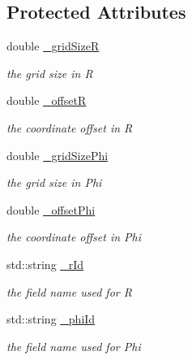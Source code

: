 \subsection*{Protected Attributes}
\begin{DoxyCompactItemize}
\item 
double \hyperlink{class_d_d4hep_1_1_d_d_segmentation_1_1_polar_grid_r_phi_a3f8b1d0889b592d5f6b08a27ef376c18}{\+\_\+grid\+SizeR}
\begin{DoxyCompactList}\small\item\em the grid size in R \end{DoxyCompactList}\item 
double \hyperlink{class_d_d4hep_1_1_d_d_segmentation_1_1_polar_grid_r_phi_aea2278c6ee89eedb09b9ef2fce3a8de0}{\+\_\+offsetR}
\begin{DoxyCompactList}\small\item\em the coordinate offset in R \end{DoxyCompactList}\item 
double \hyperlink{class_d_d4hep_1_1_d_d_segmentation_1_1_polar_grid_r_phi_abf48a7497f4d676d89b36371e4cf0af7}{\+\_\+grid\+Size\+Phi}
\begin{DoxyCompactList}\small\item\em the grid size in Phi \end{DoxyCompactList}\item 
double \hyperlink{class_d_d4hep_1_1_d_d_segmentation_1_1_polar_grid_r_phi_aad87313faf21c764d78f84130c87c178}{\+\_\+offset\+Phi}
\begin{DoxyCompactList}\small\item\em the coordinate offset in Phi \end{DoxyCompactList}\item 
std\+::string \hyperlink{class_d_d4hep_1_1_d_d_segmentation_1_1_polar_grid_r_phi_a8a4e4aea0a7943c8e77c1f9c8bdc5ffc}{\+\_\+r\+Id}
\begin{DoxyCompactList}\small\item\em the field name used for R \end{DoxyCompactList}\item 
std\+::string \hyperlink{class_d_d4hep_1_1_d_d_segmentation_1_1_polar_grid_r_phi_aeb72e70920f4eb466de969281d984053}{\+\_\+phi\+Id}
\begin{DoxyCompactList}\small\item\em the field name used for Phi \end{DoxyCompactList}\end{DoxyCompactItemize}
